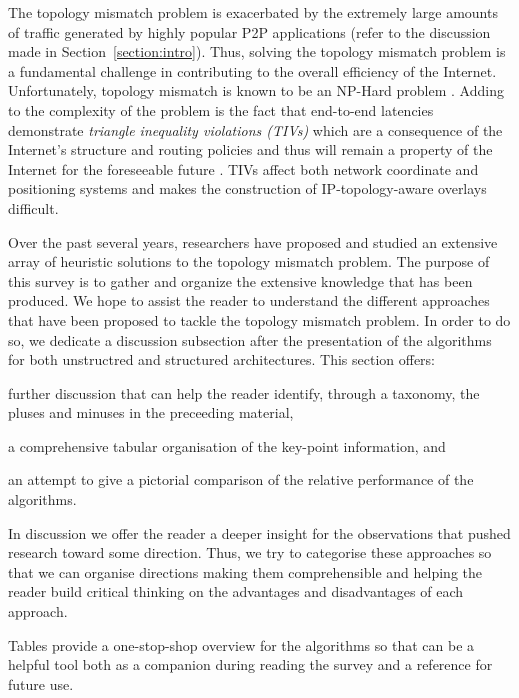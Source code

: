 The topology mismatch problem is exacerbated by the extremely large amounts of
traffic generated by highly popular P2P applications (refer to the discussion
made in Section~\ref{section:intro}). Thus, solving the topology mismatch
problem is a fundamental challenge in contributing to the overall efficiency of
the Internet. Unfortunately, topology mismatch is known to be an NP-Hard problem
\cite{NPBOOK,chawathe_scattercast_2000}. Adding to the complexity of the problem
is the fact that end-to-end latencies demonstrate \emph{triangle inequality
violations (TIVs)} which are a consequence of the Internet's structure and
routing policies and thus will remain a property of the Internet for the
foreseeable future \cite{zheng_irprtt_2005}. TIVs affect both network coordinate
\cite{cox_vivaldi_2004,wong_meridian_2005} and positioning \cite{ng_gnp_2001}
systems and makes the construction of IP-topology-aware overlays difficult.

Over the past several years, researchers have proposed and studied an extensive
array of heuristic solutions to the topology mismatch problem. The purpose of
this survey is to gather and organize the extensive knowledge that has been
produced. We hope to assist the reader to understand the different approaches
that have been proposed to tackle the topology mismatch problem. In order to do
so, we dedicate a discussion subsection after the presentation of the algorithms
for both unstructred and structured architectures. This section offers:
\begin{inparaenum}
  \item further discussion that can help the reader identify, through
a taxonomy, the pluses and minuses in the preceeding material,
  \item a comprehensive tabular organisation of the key-point information, and
  \item an attempt to give a pictorial comparison of the relative performance of
the algorithms.
\end{inparaenum}

In discussion we offer the reader a deeper insight for the observations that
pushed research toward some direction. Thus, we try to categorise these
approaches so that we can organise directions making them comprehensible
and helping the reader build critical thinking on the advantages and
disadvantages of each approach.

Tables provide a one-stop-shop overview for the algorithms so that can be a
helpful tool both as a companion during reading the survey and a reference for
future use.

